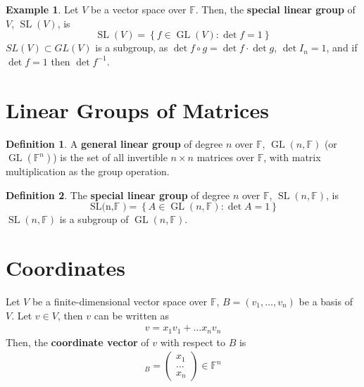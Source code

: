 \documentclass[letterpaper,12pt]{article}
\theoremstyle{definition}
\newtheorem*{definition}{Definition}
\newtheorem*{example}{Example}
\newcommand{\set}[1]{\left\{ #1 \right\}}
\begin{document}
\begin{example}
Let $V$ be a vector space over $\mathbb{F}$. Then, the \textbf{special linear group} of $V$, $\operatorname{SL}(V)$, is
\begin{equation*}
    \operatorname{SL}(V) = \set{f \in \operatorname{GL}(V) : \det{f} = 1}
\end{equation*}
$SL(V) \subset GL(V)$ is a subgroup, as $\det{f \circ g} = \det{f} \cdot \det{g}$, $\det{I_n} = 1$, and if $\det{f} = 1$ then $\det{f^{-1}}$.
\end{example}

\section*{Linear Groups of Matrices}
\begin{definition}
A \textbf{general linear group} of degree $n$ over $\mathbb{F}$, $\operatorname{GL}(n, \mathbb{F})$ (or $\operatorname{GL}(\mathbb{F}^n)$) is the set of all invertible $n \times n$ matrices over $\mathbb{F}$, with matrix multiplication as the group operation.
\end{definition}

\begin{definition}
The \textbf{special linear group} of degree $n$ over $\mathbb{F}$, $\operatorname{SL}(n, \mathbb{F})$, is
\begin{equation*}
    \operatorname{SL(n, \mathbb{F}}) = \set{A \in \operatorname{GL}(n, \mathbb{F}) : \det{A} = 1}
\end{equation*}
$\operatorname{SL}(n, \mathbb{F})$ is a subgroup of $\operatorname{GL}(n, \mathbb{F})$.
\end{definition}

\section*{Coordinates}
Let $V$ be a finite-dimensional vector space over $\mathbb{F}$, $B = (v_1, \dots, v_n)$ be a basis of $V$. Let $v \in V$, then $v$ can be written as
\begin{align*}
    v = x_1v_1 + \dots x_nv_n
\end{align*}
Then, the \textbf{coordinate vector} of $v$ with respect to $B$ is
\begin{align*}
    [v]_{B} = \begin{pmatrix} x_1 \\ \dots \\ x_n \end{pmatrix} \in \mathbb{F}^n
\end{align*}
\end{document}
